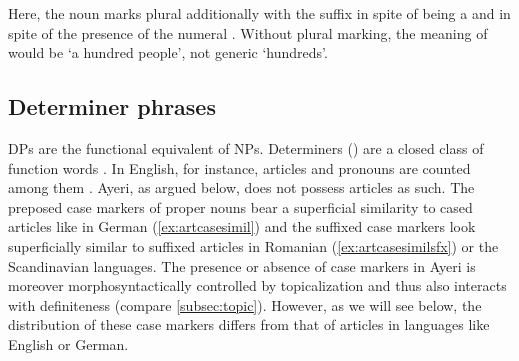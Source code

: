 Here, the noun  marks plural
additionally with the suffix  in spite of being a  and in spite of the presence of the numeral
. Without plural marking,
the meaning of  would be `a hundred people',
not generic `hundreds'.


\subsection{Determiner phrases}
\label{subsec:dps}

DPs are the functional equivalent of NPs. Determiners
() are a closed class of function words \citep[102]{bresnan2016}. In
English, for instance, articles and pronouns are counted among them
\citep[208--211]{carnie2013}. Ayeri, as argued below, does not possess articles
as such. The preposed case markers of proper nouns bear a superficial
similarity to cased articles like in German (\ref{ex:artcasesimil}) and the
suffixed case markers look superficially similar to suffixed articles in
Romanian (\ref{ex:artcasesimilsfx}) or the Scandinavian languages. The presence
or absence of case markers in Ayeri is moreover morphosyntactically controlled
by topicalization and thus also interacts with definiteness (compare
\autoref{subsec:topic}). However, as we will
see below, the distribution of these case markers differs from that of
articles in languages like English or German.

